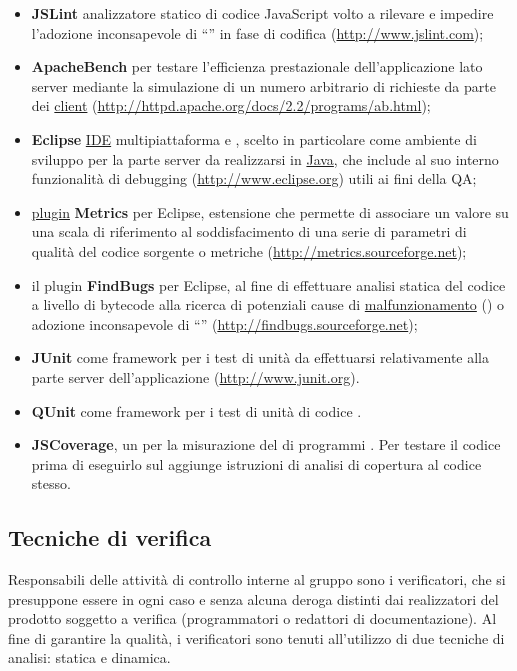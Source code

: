 {\begin{itemize}
  \item \textbf{JSLint} analizzatore statico di codice JavaScript volto a rilevare e impedire l'adozione inconsapevole di ``\underline{}'' in fase di codifica (\url{http://www.jslint.com});
  \item \textbf{ApacheBench} per testare l'efficienza prestazionale dell'applicazione lato server mediante la simulazione di un numero arbitrario di richieste da parte dei \underline{client} (\url{http://httpd.apache.org/docs/2.2/programs/ab.html});
  \item \textbf{Eclipse} \underline{IDE} multipiattaforma e , scelto in particolare come ambiente di sviluppo per la parte server da realizzarsi in \underline{Java}, che include al suo interno funzionalità di debugging (\url{http://www.eclipse.org}) utili ai fini della QA;
  \item \underline{plugin} \textbf{Metrics} per Eclipse, estensione che permette di associare un valore su una scala di riferimento al soddisfacimento di una serie di parametri di qualità del codice sorgente o metriche (\url{http://metrics.sourceforge.net});
  \item il plugin \textbf{FindBugs} per Eclipse, al fine di effettuare analisi statica del codice a livello di bytecode alla ricerca di potenziali cause di \underline{malfunzionamento} () o adozione inconsapevole di ``'' (\url{http://findbugs.sourceforge.net});
  \item \textbf{JUnit} come framework per i test di unità da effettuarsi relativamente alla parte server dell'applicazione (\url{http://www.junit.org}).
  \item \textbf{QUnit} come framework per i test di unità di codice . 
  \item \textbf{JSCoverage}, un  per la misurazione del  di programmi . Per testare il codice prima di eseguirlo sul  aggiunge istruzioni di analisi di copertura al codice stesso.  

\end{itemize}

\subsection{Tecniche di verifica}
Responsabili delle attività di controllo interne al gruppo sono i verificatori, che si presuppone essere in ogni caso e senza alcuna deroga distinti dai realizzatori del prodotto soggetto a verifica (programmatori o redattori di documentazione). Al fine di garantire la qualità, i verificatori sono tenuti all'utilizzo di due tecniche di analisi: statica e dinamica.

}
